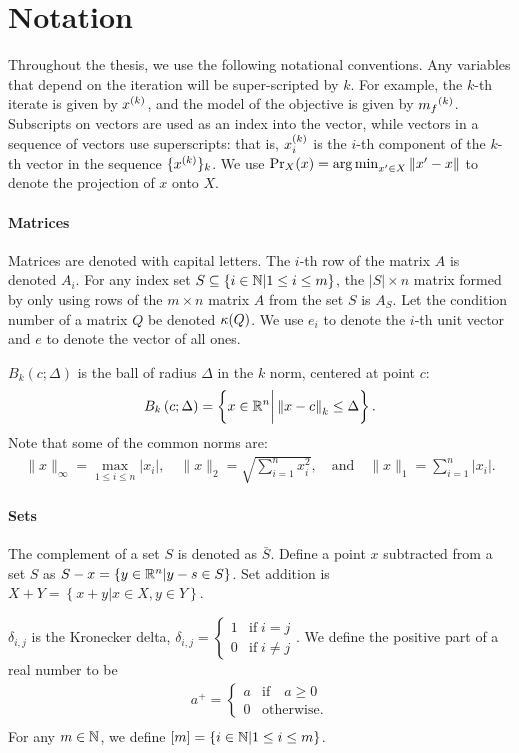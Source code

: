\section{Notation}  Throughout the thesis, we use the following notational conventions.
Any variables that depend on the iteration will be super-scripted by $k$.
For example, the $k$-th iterate is given by $x^{(k)}$, and the model of the objective is given by ${{m}_f}^{(k)}$.
Subscripts on vectors are used as an index into the vector, while vectors in a sequence of vectors use superscripts:
that is, $x_i^{(k)}$ is the $i$-th component of the $k$-th vector in the sequence $\{x^{(k)}\}_k$.
We use ${\textrm{Pr}}_X(x) = \operatorname*{arg\,min}_{x' \in X}\left\|x' - x\right\|$ to denote the projection of $x$ onto $X$.

\paragraph*{Matrices}
Matrices are denoted with capital letters.
The $i$-th row of the matrix $A$ is denoted $A_i$.
For any index set $S \subseteq \{i \in \mathbb N | 1 \le i \le m\}$, the $|S| \times n$ matrix formed by only using
rows of the $m\times n$ matrix $A$ from the set $S$ is $A_S$.
Let the condition number of a matrix $Q$ be denoted ${\kappa}(Q)$.
We use $e_i$ to denote the $i$-th unit vector and $e$ to denote the vector of all ones.

$B_k\left(c; \Delta\right)$ is the ball of radius $\Delta$ in the $k$ norm, centered at point $c$:
\begin{align}
\label{define_ball}
B_k\left(c; \Delta\right) = \left\{x \in \mathbb R^n \bigg | \left\|x - c\right\|_k \le \Delta \right\}.
\end{align}
Note that some of the common norms are:
\begin{align*}
\|x\|_{\infty} = \max_{1\le i\le n}|x_i|, \quad
\|x\|_{2} = \sqrt{\sum_{i=1}^n x_i^2}, \quad \textrm{and} \quad
\|x\|_1 = \sum_{i = 1}^n |x_i|.
\end{align*}

\paragraph*{Sets}
The complement of a set $S$ is denoted as $\bar S$.
Define a point $x$ subtracted from a set $S$ as $S - x = \left\{y \in \mathbb R^n | y - s \in S\right\}$.
Set addition is $X + Y = \left\{x + y | x \in X, y \in Y\right\}$.

$\delta_{i,j}$ is the Kronecker delta, $\delta_{i, j} = \begin{cases} 1 & \textrm{if} \; i = j \\ 0 & \textrm{if} \; i \ne j \end{cases}$.
We define the positive part of a real number to be
\begin{align*}
a^+ = \begin{cases} a & \textrm{if} \quad a \ge 0 \\ 0 & \textrm{otherwise}. \end{cases}\\
\end{align*}
For any $m \in \mathbb N$, we define $[m] = \left\{i \in \mathbb N | 1 \le i \le m\right\}$.








